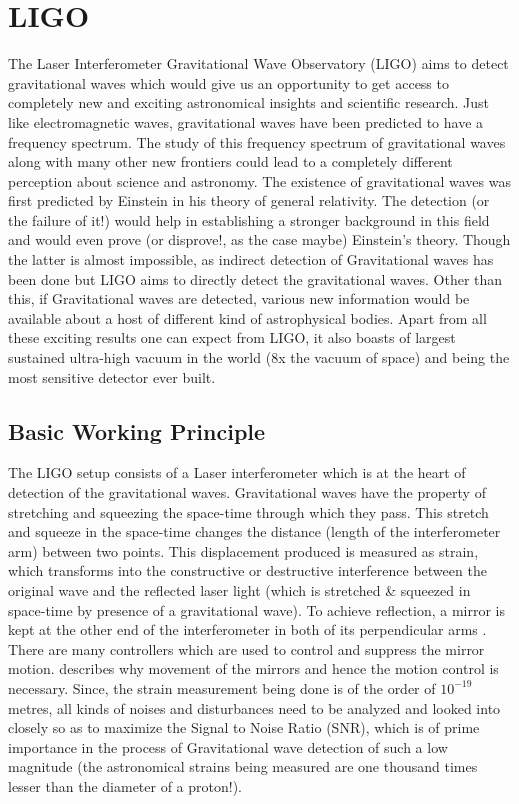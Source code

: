 \documentclass[a4paper,12pt]{article}
\begin{document}
\section{LIGO}
\label{ligo}
The Laser Interferometer Gravitational Wave Observatory (LIGO) \cite{LIGO} aims to detect gravitational waves \cite{GWD} which would give us an opportunity to get access to completely new and exciting astronomical insights and scientific research. Just like electromagnetic waves, gravitational waves have been predicted to have a frequency spectrum. The study of this frequency spectrum of gravitational waves along with many other new frontiers could lead to a completely different perception about science and astronomy. The existence of gravitational waves was first predicted by Einstein in his theory of general relativity. The detection (or the failure of it!) would help in establishing a stronger background in this field and would even prove (or disprove!, as the case maybe) Einstein's theory. Though the latter is almost impossible, as indirect detection of Gravitational waves has been done but LIGO aims to directly detect the gravitational waves. Other than this, if Gravitational waves are detected, various new information would be available about a host of different kind of astrophysical bodies. Apart from all these exciting results one can expect from LIGO, it also boasts of largest sustained ultra-high vacuum in the world (8x the vacuum of space) and being the most sensitive detector ever built.

	\subsection{Basic Working Principle}The LIGO setup consists of a Laser interferometer \cite{Interferometer} which is at the heart of detection of the gravitational waves. Gravitational waves have the property of stretching and squeezing the space-time through which they pass. This stretch and squeeze in the space-time changes the distance (length of the interferometer arm) between two points. This displacement produced is measured as strain, which transforms into the constructive or destructive interference between the original wave and the reflected laser light (which is stretched \& squeezed in space-time by presence of a gravitational wave). To achieve reflection, a mirror is kept at the other end of the interferometer in both of its perpendicular arms \cite{Interferometer}. There are many controllers which are used to control and suppress the mirror motion. \cite{Carbone} describes why movement of the mirrors and hence the motion control is necessary. Since, the strain measurement being done is of the order of $10^{-19}$ metres, all kinds of noises and disturbances need to be analyzed and looked into closely so as to maximize the Signal to Noise Ratio (SNR), which is of prime importance in the process of Gravitational wave detection of such a low magnitude (the astronomical strains being measured are one thousand times lesser than the diameter of a proton!). 
	
\end{document}
